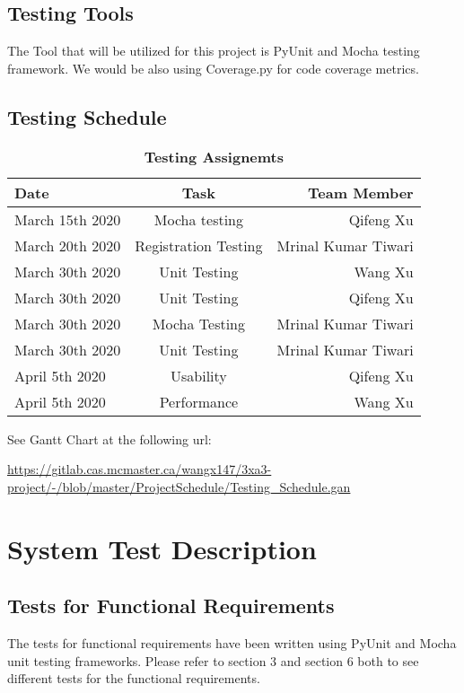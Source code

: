 \documentclass[12pt, titlepage]{article}
\begin{document}
\subsection{Testing Tools}
The Tool that will be utilized for this project is PyUnit and Mocha testing framework. We would be also using Coverage.py for code coverage metrics.

\subsection{Testing Schedule}
\begin{table}[!htbp]
    \caption{\bf Testing Assignemts}
	\begin{tabular}[pos]{|l|c|r|}
		
		\hline
		\textbf{Date}& \textbf{Task} & \textbf{Team Member} \\ \hline
		March 15th 2020& Mocha testing & Qifeng Xu\\ \hline
		March 20th 2020 & Registration Testing & Mrinal Kumar Tiwari\\ \hline
		March 30th 2020 & Unit Testing & Wang Xu
	\\ \hline
		March 30th 2020 & Unit Testing & Qifeng Xu \\ \hline
		March 30th 2020 & Mocha Testing & Mrinal Kumar Tiwari \\ \hline
		March 30th 2020 & Unit Testing & Mrinal Kumar Tiwari \\ \hline
		April 5th 2020& Usability & Qifeng Xu \\ \hline
		April 5th 2020 & Performance & Wang Xu \\ \hline 
		
	\end{tabular}
		
		\label{Table 4}	
	
\end{table}	

		
See Gantt Chart at the following url:

\url{https://gitlab.cas.mcmaster.ca/wangx147/3xa3-project/-/blob/master/ProjectSchedule/Testing_Schedule.gan}

\section{System Test Description}
	
\subsection{Tests for Functional Requirements}
The tests for functional requirements have been written using PyUnit and Mocha unit testing frameworks. Please refer to section 3 and section 6 both to see different tests for the functional requirements.
\end{document}
